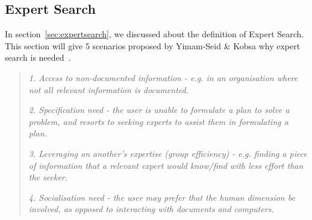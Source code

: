 \subsection{Expert Search}
In section~\ref{sec:expertsearch}, we discussed about the definition of Expert Search. This section will give 5 scenarios proposed by Yimam-Seid \& Kobsa
why expert search is needed~\cite[P. 387]{expertsearch}.
\begin{quotation}
  \item \textit{1. Access to non-documented information - e.g. in an organisation where not all relevant information is documented.}
  \item \textit{2. Specification need - the user is unable to formulate a plan to solve a problem, and resorts to seeking experts to assist them in formulating a plan.}
  \item \textit{3. Leveraging on another's expertise (group efficiency) - e.g. finding a piece of information that a relevant expert would know/find with
  less effort than the seeker.}
  \item \textit{4. Socialisation need - the user may prefer that the human dimension be involved, as opposed to interacting with documents and computers.}
\end{quotation}

